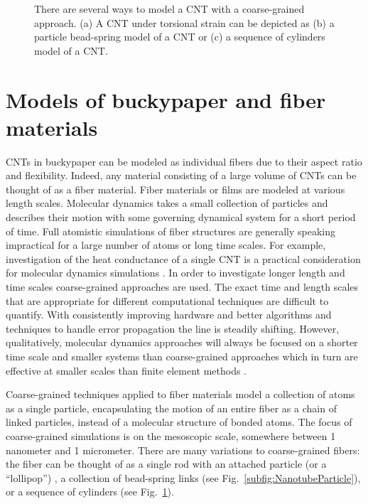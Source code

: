 \begin{figure}[t!]
\begin{subfigure}[t]{.33\textwidth}
			\caption{\label{subfig:NanotubeCylinder}}
		\end{subfigure}
		\caption{There are several ways to model a CNT with a coarse-grained approach. (a) A CNT under torsional strain can be depicted as (b) a particle bead-spring model of a CNT or (c) a sequence of cylinders model of a CNT. \label{fig:CoarseGrain}}	
	\end{figure}

\section{Models of buckypaper and fiber materials}

	CNTs in buckypaper can be modeled as individual fibers due to their aspect ratio and flexibility. Indeed, any material consisting of a large volume of CNTs can be thought of as a fiber material. Fiber materials or films are modeled at various length scales. Molecular dynamics takes a small collection of particles and describes their motion with some governing dynamical system for a short period of time. Full atomistic simulations of fiber structures are generally speaking impractical for a large number of atoms or long time scales. For example, investigation of the heat conductance of a single CNT is a practical consideration for molecular dynamics simulations \cite{Maruyama2003}. In order to investigate longer length and time scales coarse-grained approaches are used. The exact time and length scales that are appropriate for different computational techniques are difficult to quantify. With consistently improving hardware and better algorithms and techniques to handle error propagation the line is steadily shifting. However, qualitatively, molecular dynamics approaches will always be focused on a shorter time scale and smaller systems than coarse-grained approaches which in turn are effective at smaller scales than finite element methods \cite{Muller2002}.
	
	Coarse-grained techniques applied to fiber materials model a collection of atoms as a single particle, encapsulating the motion of an entire fiber as a chain of linked particles, instead of a molecular structure of bonded atoms. The focus of coarse-grained simulations is on the mesoscopic scale, somewhere between 1 nanometer and 1 micrometer.  There are many variations to coarse-grained fibers: the fiber can be thought of as a single rod with an attached particle (or a ``lollipop'') \cite{Buehler2006}, a collection of bead-spring links \cite{Li2012} (see Fig.~\ref{subfig:NanotubeParticle}), or a sequence of cylinders \cite{Volkov2008} (see Fig.~\ref{subfig:NanotubeCylinder}).
	
